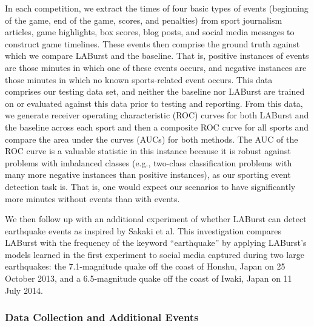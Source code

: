 \documentclass{sig-alternate}
\begin{document}
In each competition, we extract the times of four basic types of events (beginning of the game, end of the game, scores, and penalties) from sport journalism articles, game highlights, box scores, blog posts, and social media messages to construct game timelines.
These events then comprise the ground truth against which we compare LABurst and the baseline.
That is, positive instances of events are those minutes in which one of these events occurs, and negative instances are those minutes in which no known sports-related event occurs.
This data comprises our testing data set, and neither the baseline nor LABurst are trained on or evaluated against this data prior to testing and reporting.
From this data, we generate receiver operating characteristic (ROC) curves for both LABurst and the baseline across each sport and then a composite ROC curve for all sports and compare the area under the curves (AUCs) for both methods.
The AUC of the ROC curve is a valuable statistic in this instance because it is robust against problems with imbalanced classes (e.g., two-class classification problems with many more negative instances than positive instances), as our sporting event detection task is.
That is, one would expect our scenarios to have significantly more minutes without events than with events.

We then follow up with an additional experiment of whether LABurst can detect earthquake events as inspired by Sakaki et al.
This investigation compares LABurst with the frequency of the keyword ``earthquake'' by applying LABurst's models learned in the first experiment to social media captured during two large earthquakes: the 7.1-magnitude quake off the coast of Honshu, Japan on 25 October 2013, and a 6.5-magnitude quake off the coast of Iwaki, Japan on 11 July 2014.

\subsubsection{Data Collection and Additional Events}
\end{document}
